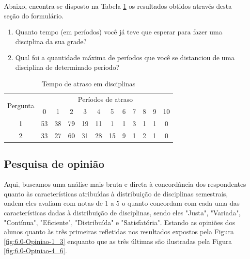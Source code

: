         Abaixo, encontra-se disposto na Tabela \ref{table:5.0-Atrasos} os resultados obtidos através desta seção do formulário.
        
        \begin{enumerate}
            \item Quanto tempo (em períodos) você já teve que esperar para fazer uma disciplina da sua grade?
            \item Qual foi a quantidade máxima de períodos que você se distanciou de uma disciplina de determinado período?
        \end{enumerate}


        \begin{table}[htbp]
            \centering
            \caption{\label{table:5.0-Atrasos}Tempo de atraso em disciplinas}
            \begin{tabular}{| c | c c c c c c c c c c c |}
                \hline
                    \multicolumn{1}{|c|}{\multirow{2}{*}{Pergunta}} &
                    \multicolumn{11}{c|}{Períodos de atraso} \\
                    \multicolumn{1}{|c|}{}  &
                    \multicolumn{1}{c|}{0} &
                    \multicolumn{1}{c|}{1} &
                    \multicolumn{1}{c|}{2} &
                    \multicolumn{1}{c|}{3} &
                    \multicolumn{1}{c|}{4} &
                    \multicolumn{1}{c|}{5} &
                    \multicolumn{1}{c|}{6} &
                    \multicolumn{1}{c|}{7} &
                    \multicolumn{1}{c|}{8} &
                    \multicolumn{1}{c|}{9} &
                    \multicolumn{1}{|c|}{10}
                    \\
                \hline
                     1 & 53 & 38 & 79 & 19 & 11 &  1 &  1 &  3 &  1 &  1 &  0 \\
                     2 & 33 & 27 & 60 & 31 & 28 & 15 &  9 &  1 &  2 &  1 &  0 \\
                \hline
            \end{tabular}
        \end{table}

    \subsection{Pesquisa de opinião} %

        Aqui, buscamos uma análise mais bruta e direta à concordância dos respondentes quanto às características atribuídas à distribuição de disciplinas semestrais, ondem eles avaliam com notas de 1 a 5 o quanto concordam com cada uma das características dadas à distribuição de disciplinas, sendo eles "Justa", "Variada", "Contínua", "Eficiente", "Distribuída" e "Satisfatória". Estando as opiniões dos alunos quanto às três primeiras refletidas nos resultados expostos pela Figura \ref{fig:6.0-Opiniao-1_3} enquanto que as três últimas são ilustradas pela Figura \ref{fig:6.0-Opiniao-4_6}.

